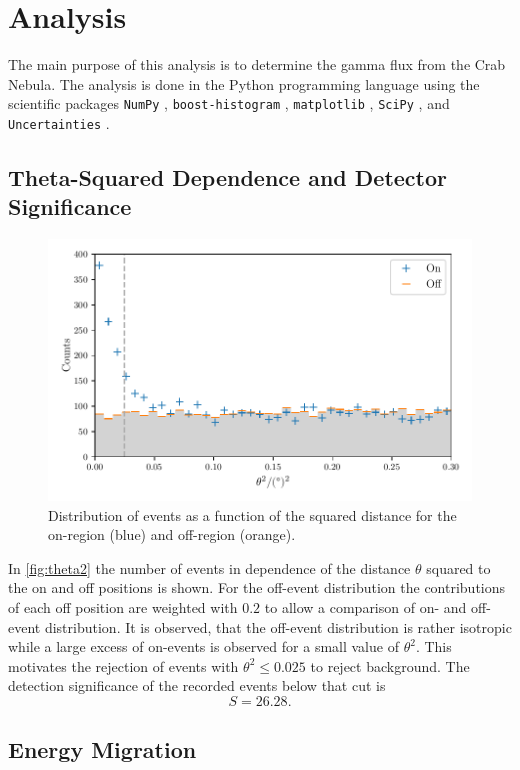 \section{Analysis}\label{sec:analysis}
The main purpose of this analysis is to determine the gamma flux from the Crab Nebula. The analysis is done in the Python programming language using the scientific packages
\texttt{NumPy} \cite{2020NumPy-Array},
\texttt{boost-histogram} \cite{henry_schreiner_2021_4728963},
\texttt{matplotlib} \cite{matplotlib},
\texttt{SciPy} \cite{2020SciPy-NMeth}, and
\texttt{Uncertainties} \cite{uncertainties}.
\subsection{Theta-Squared Dependence and Detector Significance}

\begin{figure}[tb]
  \centering
  \includegraphics[width=.7\textwidth]{plots/theta_square.pdf}
  \caption{Distribution of events as a function of the squared distance for the on-region (blue) and off-region (orange).}
  \label{fig:theta2}
\end{figure}

In \autoref{fig:theta2} the number of events in dependence of the distance $\theta$ squared to the on and off positions is shown. For the off-event distribution the contributions of each off position are weighted with $0.2$ to allow a comparison of on- and off-event distribution. It is observed, that the off-event distribution is rather isotropic while a large excess of on-events is observed for a small value of $\theta^2$. This motivates the rejection of events with $\theta^2 \leq \num{0.025}$ to reject background. The detection significance of the recorded events below that cut is
\begin{equation}
  S = \num{26.28}. %
\end{equation}

\subsection{Energy Migration}

